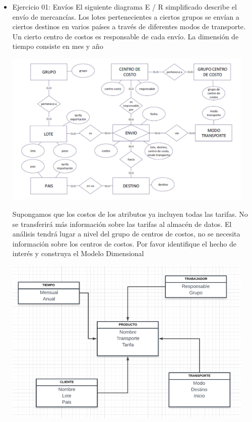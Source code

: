 \documentclass[preprint,12pt]{elsarticle}
\begin{document}
\begin{itemize}

\item Ejercicio 01: Envíos
El siguiente diagrama E / R simplificado describe el envío de mercancías. Los lotes pertenecientes a ciertos grupos se envían a ciertos destinos en varios países a través de diferentes modos de transporte. Un cierto centro de costos es responsable de cada envío. La dimensión de tiempo consiste en mes y año


\begin{center}
	\includegraphics[width=12cm]{./Imagenes/MODELO_ER_1} 
\end{center}

Supongamos que los costos de los atributos ya incluyen todas las tarifas. No se transferirá más información sobre las tarifas
al almacén de datos. El análisis tendrá lugar a nivel del grupo de centros de costos, no se necesita información sobre los
centros de costos.
Por favor identifique el hecho de interés y construya el Modelo Dimensional 


\begin{center}
	\includegraphics[width=12cm]{./Imagenes/MODELO_D_1} 
\end{center}



\end{itemize}
\end{document}
